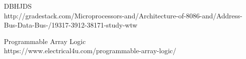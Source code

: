 \newpage
{}
    \begin{thebibliography}{9}

     DBHJDS\\
    http://gradestack.com/Microprocessors-and/Architecture-of-8086-and/Address-Bus-Data-Bus-/19317-3912-38171-study-wtw

     Programmable Array Logic\\
    https://www.electrical4u.com/programmable-array-logic/

    \end{thebibliography}
